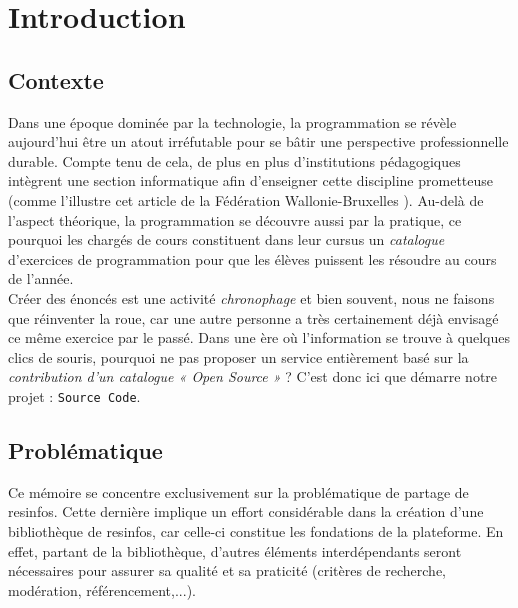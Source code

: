 \chapter{Introduction}

\section*{Contexte}

Dans une époque dominée par la technologie, la programmation se révèle aujourd’hui être un atout irréfutable pour se bâtir une perspective professionnelle durable. Compte tenu de cela, de plus en plus d’institutions pédagogiques intègrent une section informatique afin d’enseigner cette discipline prometteuse (comme l'illustre cet article de la Fédération Wallonie-Bruxelles \cite{MAG_PROG}). Au-delà de l’aspect théorique, la programmation se découvre aussi par la pratique, ce pourquoi les chargés de cours constituent dans leur cursus un \textit{catalogue} d’exercices de programmation pour que les élèves puissent les résoudre au cours de l'année.\\

Créer des énoncés est une activité \textit{chronophage} et bien souvent, nous ne faisons que réinventer la roue, car une autre personne a très certainement déjà envisagé ce même exercice par le passé.
Dans une ère où l’information se trouve à quelques clics de souris, pourquoi ne pas proposer un service entièrement basé sur la \textit{contribution d’un catalogue « Open Source »} ? C’est donc ici que démarre notre projet : \texttt{Source Code}.\\

\section*{Problématique}

Ce mémoire se concentre exclusivement sur la problématique de partage de \glspl{resinfo}.
Cette dernière implique un effort considérable dans la création d'une bibliothèque de \glspl{resinfo}, car celle-ci constitue les fondations de la plateforme. En effet, partant de la bibliothèque, d'autres éléments interdépendants seront nécessaires pour assurer sa qualité et sa praticité (critères de recherche, modération, référencement,...).

